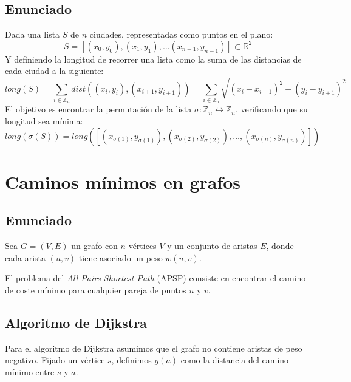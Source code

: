 \documentclass[a4paper, 11pt]{article} %
\begin{document}
  \subsection{Enunciado}
  	Dada una lista $S$ de $n$ ciudades, representadas como puntos en el plano:
  	\begin{equation}
  	    S = [(x_0,y_0), (x_1,y_1), \dots (x_{n-1},y_{n-1})] \subset \mathbb{R}^2
  	\end{equation}
  	Y definiendo la longitud de recorrer una lista como la suma de las distancias de cada ciudad a la siguiente:
  	\begin{equation}
  	    long(S) = \sum_{i \in \mathbb{Z}_n} dist((x_i,y_i), (x_{i+1}, y_{i+1})) = \sum_{i \in \mathbb{Z}_n} \sqrt{(x_i-x_{i+1})^2 + (y_i-y_{i+1})^2}
  	\end{equation}
  	El objetivo es encontrar la permutación de la lista $\sigma : \mathbb{Z}_n \leftrightarrow \mathbb{Z}_n$, verificando que su longitud sea mínima:
  	\begin{equation}
  	    long(\sigma(S)) = long([(x_{\sigma(1)},y_{\sigma(1)}), (x_{\sigma(2)},y_{\sigma(2)}), \dots, (x_{\sigma(n)},y_{\sigma(n)})])
      \end{equation}
      

\section{Caminos mínimos en grafos}
  \subsection{Enunciado}
    Sea $G=(V,E)$ un grafo con $n$ vértices $V$ y un conjunto de aristas $E$,
    donde cada arista $(u,v)$ tiene asociado un peso $w(u,v)$.
    
    El problema del \textit{All Pairs Shortest Path} (APSP) consiste en encontrar el camino de coste mínimo para cualquier pareja de puntos $u$ y $v$.
  
  \subsection{Algoritmo de Dijkstra}
    Para el algoritmo de Dijkstra asumimos que el grafo no contiene aristas de peso negativo.
    Fijado un vértice $s$, definimos $g(a)$ como la distancia del camino mínimo entre $s$ y $a$.
    
\end{document}
